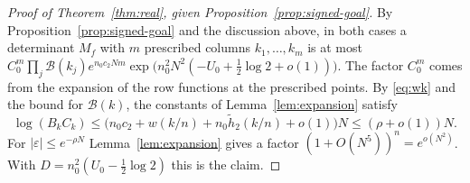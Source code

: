 \begin{proof}[Proof of Theorem~\ref{thm:real}, given Proposition~\ref{prop:signed-goal}]
By Proposition~\ref{prop:signed-goal} and the discussion above, in both cases a determinant $M_f$ with $m$
prescribed columns $k_1,\ldots,k_m$ is at most
$C_0^m\prod_j\mathcal B(k_j)e^{n_0c_2Nm}\exp\bigl(n_0^2N^2(-U_0+\frac12\log2+o(1))\bigr)$. The factor $C_0^m$ comes
from the expansion of the row functions at the prescribed points. By \eqref{eq:wk} and the bound for
$\mathcal B(k)$, the constants of Lemma~\ref{lem:expansion} satisfy
\[
 \log(B_kC_k)\le\bigl(n_0c_2+w(k/n)+n_0\tilde h_2(k/n)+o(1)\bigr)N\le(\rho+o(1))N .
\]
For $|\varepsilon|\le e^{-\rho N}$ Lemma~\ref{lem:expansion} gives a factor $(1+O(N^5))^n=e^{o(N^2)}$. With
$D=n_0^2(U_0-\frac12\log2)$ this is the claim.
\end{proof}
